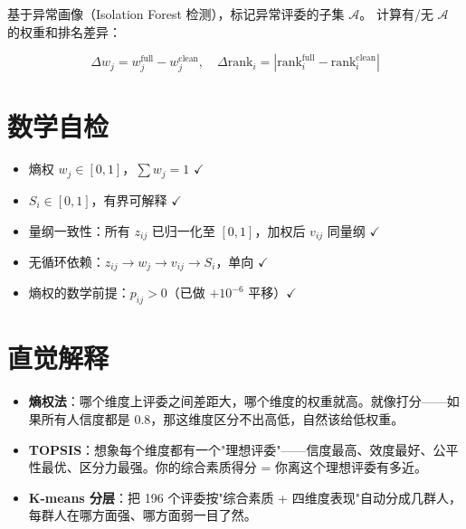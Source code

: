 \documentclass[UTF8]{ctexart}
\begin{document}
基于异常画像（Isolation Forest 检测），标记异常评委的子集 $\mathcal{A}$。
计算有/无 $\mathcal{A}$ 的权重和排名差异：

\begin{equation}
\Delta w_j = w_j^{\text{full}} - w_j^{\text{clean}}, \quad \Delta\text{rank}_i = |\text{rank}_i^{\text{full}} - \text{rank}_i^{\text{clean}}|
\end{equation}

\section{数学自检}

\begin{itemize}
    \item 熵权 $w_j \in [0,1]$，$\sum w_j = 1$ $\checkmark$
    \item $S_i \in [0,1]$，有界可解释 $\checkmark$
    \item 量纲一致性：所有 $z_{ij}$ 已归一化至 $[0,1]$，加权后 $v_{ij}$ 同量纲 $\checkmark$
    \item 无循环依赖：$z_{ij} \to w_j \to v_{ij} \to S_i$，单向 $\checkmark$
    \item 熵权的数学前提：$p_{ij} > 0$（已做 $+10^{-6}$ 平移）$\checkmark$
\end{itemize}

\section{直觉解释}

\begin{itemize}
    \item \textbf{熵权法}：哪个维度上评委之间差距大，哪个维度的权重就高。就像打分——如果所有人信度都是 0.8，那这维度区分不出高低，自然该给低权重。
    \item \textbf{TOPSIS}：想象每个维度都有一个"理想评委"——信度最高、效度最好、公平性最优、区分力最强。你的综合素质得分 = 你离这个理想评委有多近。
    \item \textbf{K-means 分层}：把 196 个评委按"综合素质 + 四维度表现"自动分成几群人，每群人在哪方面强、哪方面弱一目了然。
\end{itemize}
\end{document}
